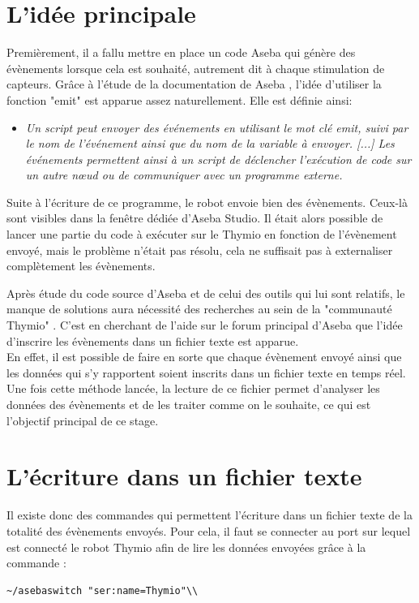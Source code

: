 \documentclass[a4paper, 12pt]{report}
\begin{document}
\section{L'idée principale}
Premièrement, il a fallu mettre en place un code Aseba \pageref{aseba} qui génère des évènements lorsque cela est souhaité, autrement dit à chaque stimulation de capteurs. Grâce à l'étude de la documentation de Aseba  \pageref{aseba}, l'idée d'utiliser la fonction "emit" est apparue assez naturellement. Elle est définie ainsi:

\begin{itemize}
\item{\textit{Un script peut envoyer des événements en utilisant le mot clé emit, suivi par le nom de l'événement ainsi que du nom de la variable à envoyer. [...] Les événements permettent ainsi à un script de déclencher l'exécution de code sur un autre nœud ou de communiquer avec un programme externe.}}
\end{itemize}

Suite à l'écriture de ce programme, le robot envoie bien des évènements. Ceux-là sont visibles dans la fenêtre dédiée d'Aseba Studio. Il était alors possible de lancer une partie du code à exécuter sur le Thymio \pageref{thymio} en fonction de l'évènement envoyé, mais le problème n'était pas résolu, cela ne suffisait pas à externaliser complètement les évènements.

Après étude du code source d'Aseba \cite{CodeASEBA} et de celui des outils qui lui sont relatifs, le manque de solutions aura nécessité des recherches au sein de la "communauté Thymio" \pageref{PhiloThymio}. C'est en cherchant de l'aide sur le forum principal d'Aseba que l'idée d'inscrire les évènements dans un fichier texte est apparue.\cite{ForumThymio}\\
En effet, il est possible de faire en sorte que chaque évènement envoyé ainsi que les données qui s'y rapportent soient inscrits dans un fichier texte en temps réel. Une fois cette méthode lancée, la lecture de ce fichier permet d'analyser les données des évènements et de les traiter comme on le souhaite, ce qui est l'objectif principal de ce stage.

\section{L'écriture dans un fichier texte}
Il existe donc des commandes qui permettent l'écriture dans un fichier texte de la totalité des évènements envoyés. Pour cela, il faut se connecter au port sur lequel est connecté le robot Thymio afin de lire les données envoyées grâce à la commande :
\begin{verbatim}
~/asebaswitch "ser:name=Thymio"\\
\end{verbatim}
 
\end{document}
